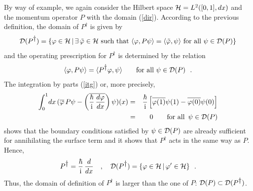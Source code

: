 \documentclass[a4wide,12pt]{report}
\begin{document}
By way of example, we again consider the Hilbert space 
$\hs =  L^2 ([0,1], dx)$
and the momentum operator 
$P$ with the domain (\ref{dir}). According to the previous definition, 
the domain of $P^{\dag}$ is given by 
\[
{\cal D} (P^{\dag}) = \{ \varphi \in \hs \, | \, \exists\,
\tilde{\varphi} \in \hs \ \mbox{such that} \
\langle \varphi , P \psi \rangle =
\langle \tilde \varphi , \psi \rangle
\ \mbox{for all} \ \psi  \in {\cal D} (P) \}
\]
and the operating prescription for $P^{\dag}$ is determined  
by the relation 
\begin{equation}
\langle \varphi , P \psi \rangle =
\langle P^{\dag} \varphi , \psi \rangle
\qquad \mbox{for all} \ \psi \in {\cal D}(P)
\ \ .
\end{equation}
The integration by parts (\ref{itg})
or, more precisely, 
\begin{eqnarray}
\int_0^1 \! d x \, (  \overline{\varphi} \, P\psi
-
\left( \overline{\ds{\hbar \over \ri} \,
\ds{d\varphi \over dx} }  \right) \psi ) ( x )
&=& \ds{\hbar \over \ri} \left[ \overline{\varphi( 1)} \psi (1) -
\overline{ \varphi ( 0)} \psi (0) \right] 
\nonumber 
\\
& =& 0
\qquad  \mbox{for all} \ \, \psi \in {\cal D}( P)
\nonumber 
\end{eqnarray} 
shows that the boundary conditions satisfied by 
$\psi \in {\cal D}(P)$ are already sufficient 
for annihilating the surface term
and it shows that $P^{\dag}$ acts in the same way as  $P$. 
Hence, 
\begin{equation}
\label{dadj}
P^{\dag}  = \ds{\hbar \over \ri} \, \ds{d \over dx}
\quad , \quad
{\cal D} (P^{\dag}) = \{ \varphi \in \hs \, | \, \varphi^{\prime}
\in \hs \}
\ \ .
\end{equation}
Thus, the domain of definition of $P^{\dag}$ is larger 
than the one of $P$:
${\cal D}(P) \subset {\cal D}(P^{\dag})$.
 
\bigskip 
\end{document}
